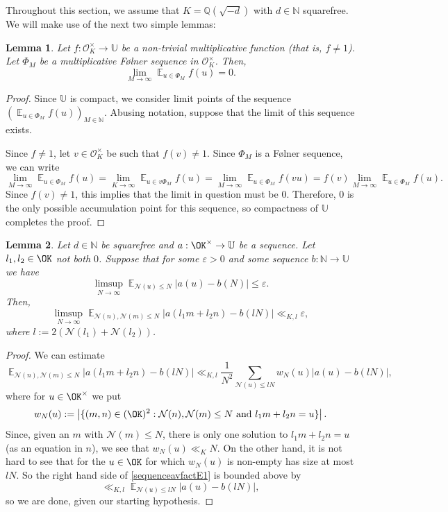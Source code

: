 \documentclass[11pt]{amsart}
\newtheorem{lemma}{Lemma}[section]
\theoremstyle{definition}
\DeclareMathOperator*{\E}{\mathbb{E}}
\newcommand{\N}{{\mathbb N}}
\newcommand{\NN}{{\mathcal N}}
\newcommand{\Q}{{\mathbb Q}}
\newcommand{\U}{{\mathbb U}}
\begin{document}
Throughout this section, we assume that $K=\Q(\sqrt{-d})$ with $d\in\N$ squarefree.
We will make use of the next two simple lemmas:
\begin{lemma}\label{multav0}
Let $f: \mathcal{O}_K^{\times} \to \U$ be a non-trivial multiplicative function (that is, $f \neq 1$). Let $\Phi_M$ be a multiplicative F\o lner sequence in $\mathcal{O}_K^{\times}$. Then,
\[
\lim_{M \to \infty} \E_{u \in \Phi_M} f(u) = 0.
\]
\end{lemma}
\begin{proof}
Since $\U$ is compact, we consider limit points of the sequence $(\E_{u \in \Phi_M}f(u))_{M \in \N}$. Abusing notation, suppose that the limit of this sequence exists. 

Since $f\neq 1$, let $v \in \mathcal{O}_K^{\times}$ be such that $f(v)\neq 1$. Since $\Phi_M$ is a F\o lner sequence, we can write
\[
\lim_{M \to \infty} \E_{u \in \Phi_M} f(u) = \lim_{K \to \infty} \E_{u \in v\Phi_M} f(u) = \lim_{M \to \infty} \E_{u \in \Phi_M} f(vu) = f(v) \lim_{M \to \infty} \E_{u \in \Phi_M} f(u).
\]
Since $f(v) \neq 1$, this implies that the limit in question must be $0$. Therefore, $0$ is the only possible accumulation point for this sequence, so compactness of $\U$ completes the proof.
\end{proof}
\begin{lemma}\label{sequenceavfact}
Let $d\in\N$ be squarefree and $a: \OK^{\times} \to \U$ be a sequence. Let $l_1, l_2 \in \OK$ not both $0$. Suppose that for some $\varepsilon>0$ and some sequence $b: \N \to \U$ we have
\[
\limsup_{N \to \infty} \E_{\NN(u) \leq N} |a(u)-b(N)| \leq \varepsilon.
\]
Then,
\[
\limsup_{N \to \infty} \E_{\NN(n), \NN(m) \leq N} |a(l_1m+l_2n)-b(lN)| \ll_{K,l} \varepsilon,
\]
where $l:=2(\NN(l_1)+\NN(l_2))$.
\end{lemma}
\begin{proof}
We can estimate
\begin{equation}\label{sequenceavfactE1}
\E_{\NN(n), \NN(m) \leq N} |a(l_1m+l_2n)-b(lN)| \ll_{K,l} \frac{1}{N^2}\sum_{\NN(u) \leq lN} w_N(u) |a(u)-b(lN)|,
\end{equation}
%
%
%
where for $u \in \OK^{\times}$ we put $$w_N(u):=\left|\{(m,n)\in (\OK)^{2}: \NN(n), \NN(m) \leq N \text{ and }l_1m+l_2n=u\}\right|.$$ Since, given an $m$ with $\NN(m) \leq N$, there is only one solution to $l_1m+l_2n=u$ (as an equation in $n$), we see that $w_N(u) \ll_{K} N$. On the other hand, it is not hard to see that for the $u\in\OK$ for which $w_{N}(u)$ is non-empty has size at most $lN$. So the right hand side of \eqref{sequenceavfactE1} is bounded above   by
\[
\ll_{K,l}\E_{\NN(u) \leq lN} |a(u)-b(lN)|,
\]
so we are done, given our starting hypothesis.
\end{proof}
\end{document}
